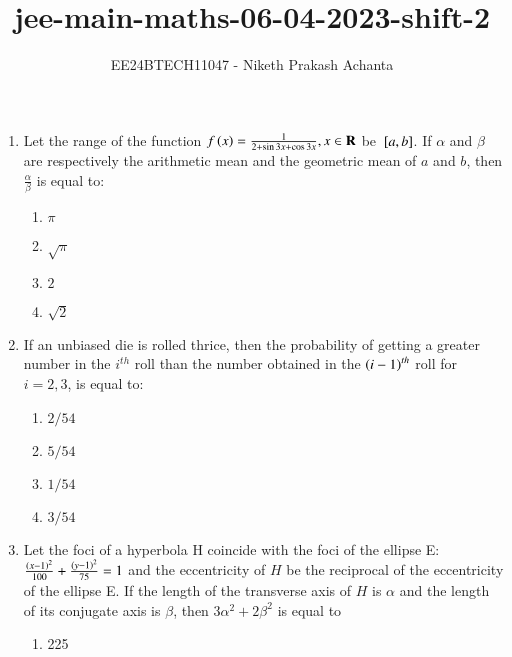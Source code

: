 \documentclass[journal]{IEEEtran}
\renewcommand{\thefigure}{\theenumi}
\renewcommand{\thetable}{\theenumi}
\numberwithin{equation}{enumi}
\numberwithin{figure}{enumi}
\renewcommand{\thetable}{\theenumi}
\begin{document}

\vspace{3cm}

\title{jee-main-maths-06-04-2023-shift-2}
\author{EE24BTECH11047 - Niketh Prakash Achanta}
{\let\newpage\relax\maketitle}
\renewcommand{\thefigure}{\theenumi}
\renewcommand{\thetable}{\theenumi}

\begin{enumerate}

    \item Let the range of the function $f\left(x\right)=\frac{1}{2+\sin{3x}+\cos{3x}},x\in\mathbf{R}$ be ${}\left[a, b\right]$. If $\alpha$ and $\beta$ are respectively the arithmetic mean and the geometric mean of $a$ and $b$, then $\frac{\alpha}{\beta}$ is equal to:
    \begin{enumerate}
        \item $\pi$
        \item $\sqrt{\pi}$
        \item $2$
        \item $\sqrt{2}$
    \end{enumerate}
    \item If an unbiased die is rolled thrice, then the probability of getting a greater number in the $i^{th}$ roll than the number obtained in the $\left(i-1\right)^{th}$ roll for $i = 2, 3$, is equal to:
    \begin{enumerate}
        \item $2/54$
        \item $5/54$
        \item $1/54$
        \item $3/54$
    \end{enumerate}
    \item Let the foci of a hyperbola H coincide with the foci of the ellipse E:$\frac{\left(x-1\right)^2}{100} + \frac{\left(y-1\right)^2}{75} = 1$ and the eccentricity of $H$ be the reciprocal of the eccentricity of the ellipse E. If the length of the transverse axis of $H$ is $\alpha$ and the length of its conjugate axis is $\beta$, then $3\alpha^2 + 2\beta^2$ is equal to
    \begin{enumerate}
        \item 225

\end{enumerate}
\end{enumerate}
\end{document}
